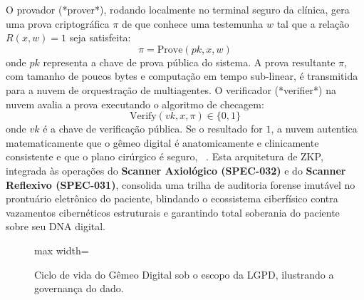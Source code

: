 O provador (*prover*), rodando localmente no terminal seguro da clínica, gera uma prova criptográfica $\pi$ de que conhece uma testemunha $w$ tal que a relação $R(x,w) = 1$ seja satisfeita:
\begin{equation}
    \pi = \text{Prove}(pk, x, w)
\end{equation}
onde $pk$ representa a chave de prova pública do sistema. A prova resultante $\pi$, com tamanho de poucos bytes e computação em tempo sub-linear, é transmitida para a nuvem de orquestração de multiagentes. O verificador (*verifier*) na nuvem avalia a prova executando o algoritmo de checagem:
\begin{equation}
    \text{Verify}(vk, x, \pi) \in \{0, 1\}
\end{equation}
onde $vk$ é a chave de verificação pública. Se o resultado for $1$, a nuvem autentica matematicamente que o gêmeo digital é anatomicamente e clinicamente consistente e que o plano cirúrgico é seguro, ~\cite{techsoc2025precision}. Esta arquitetura de ZKP, integrada às operações do \textbf{Scanner Axiológico (SPEC-032)} e do \textbf{Scanner Reflexivo (SPEC-031)}, consolida uma trilha de auditoria forense imutável no prontuário eletrônico do paciente, blindando o ecossistema ciberfísico contra vazamentos cibernéticos estruturais e garantindo total soberania do paciente sobre seu DNA digital.

\begin{figure}[h!]
    \centering
    \begin{adjustbox}{max width=\textwidth}
\end{adjustbox}
    \caption{Ciclo de vida do Gêmeo Digital sob o escopo da LGPD, ilustrando a governança do dado.}
    \label{fig:lgpd-workflow}
\end{figure}
